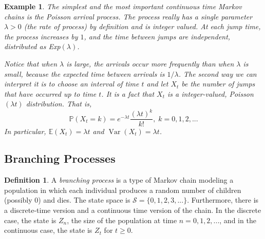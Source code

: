 \documentclass{article}
\DeclareMathOperator{\Var}{Var}
\newtheorem{example}{Example}[section]
\theoremstyle{remark}
\theoremstyle{definition}
\newtheorem{definition}{Definition}[section]
\begin{document}
\begin{example}
The simplest and the most important continuous time Markov chains is the Poisson arrival process. The process really has a single parameter $\lambda >0$ (the rate of process) by definition and is integer valued. At each jump time, the process increases by $1$, and the time between jumps are independent, distributed as Exp$(\lambda)$. 

Notice that when $\lambda$ is large, the arrivals occur more frequently than when $\lambda$ is small, because the expected time between arrivals is $1/\lambda$. The second way we can interpret it is to choose an interval of time $t$ and let $X_t$ be the number of jumps that have occurred up to time $t$. It is a fact that $X_t$ is a integer-valued, Poisson$(\lambda t)$ distribution. That is, 
\[\mathbb{P}(X_t = k) = e^{-\lambda t} \frac{(\lambda t)^k}{k!}, \; k = 0, 1, 2, ...\]
In particular, $\mathbb{E}(X_t) = \lambda t$ and $\Var(X_t) = \lambda t$. 
\end{example}

\subsection{Branching Processes}
\begin{definition}
A \textit{branching process} is a type of Markov chain modeling a population in which each individual produces a random number of children (possibly $0$) and dies. The state space is $\mathcal{S} = \{0, 1, 2, 3, ...\}$. Furthermore, there is a discrete-time version and a continuous time version of the chain. In the discrete case, the state is $Z_n$, the size of the population at time $n = 0, 1, 2, ...$, and in the continuous case, the state is $Z_t$ for $t \geq 0$. 
\end{definition}
\end{document}
